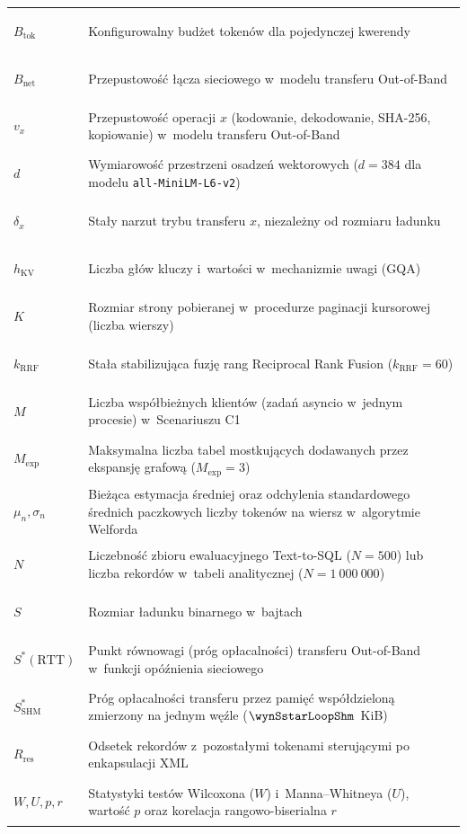 \begin{longtable}[l]{>{\bfseries\raggedright\arraybackslash}p{2.8cm} >{\raggedright\arraybackslash}p{12.0cm}}
$B_{\text{tok}}$ & Konfigurowalny budżet tokenów dla pojedynczej kwerendy \\[1.5pt]
$B_{\text{net}}$ & Przepustowość łącza sieciowego w~modelu transferu Out-of-Band \\[1.5pt]
$v_x$ & Przepustowość operacji $x$ (kodowanie, dekodowanie, SHA-256, kopiowanie) w~modelu transferu Out-of-Band \\[1.5pt]
$d$ & Wymiarowość przestrzeni osadzeń wektorowych ($d = 384$ dla modelu \texttt{all-MiniLM-L6-v2}) \\[1.5pt]
$\delta_x$ & Stały narzut trybu transferu $x$, niezależny od rozmiaru ładunku \\[1.5pt]
$h_{\text{KV}}$ & Liczba głów kluczy i~wartości w~mechanizmie uwagi (GQA) \\[1.5pt]
$K$ & Rozmiar strony pobieranej w~procedurze paginacji kursorowej (liczba wierszy) \\[1.5pt]
$k_{\text{RRF}}$ & Stała stabilizująca fuzję rang Reciprocal Rank Fusion ($k_{\text{RRF}} = 60$) \\[1.5pt]
$M$ & Liczba współbieżnych klientów (zadań asyncio w~jednym procesie) w~Scenariuszu C1 \\[1.5pt]
$M_{\text{exp}}$ & Maksymalna liczba tabel mostkujących dodawanych przez ekspansję grafową ($M_{\text{exp}} = 3$) \\[1.5pt]
$\mu_n, \sigma_n$ & Bieżąca estymacja średniej oraz odchylenia standardowego średnich paczkowych liczby tokenów na wiersz w~algorytmie Welforda \\[1.5pt]
$N$ & Liczebność zbioru ewaluacyjnego Text-to-SQL ($N = 500$) lub liczba rekordów w~tabeli analitycznej ($N = 1\ 000\ 000$) \\[1.5pt]
$S$ & Rozmiar ładunku binarnego w~bajtach \\[1.5pt]
$S^*(\text{RTT})$ & Punkt równowagi (próg opłacalności) transferu Out-of-Band w~funkcji opóźnienia sieciowego \\[1.5pt]
$S^*_{\text{SHM}}$ & Próg opłacalności transferu przez pamięć współdzieloną zmierzony na jednym węźle ($\wynSstarLoopShm$~KiB) \\[1.5pt]
$R_{\text{res}}$ & Odsetek rekordów z~pozostałymi tokenami sterującymi po enkapsulacji XML \\[1.5pt]
$W, U, p, r$ & Statystyki testów Wilcoxona ($W$) i~Manna--Whitneya ($U$), wartość $p$ oraz korelacja rangowo-biserialna $r$ \\
\end{longtable}
